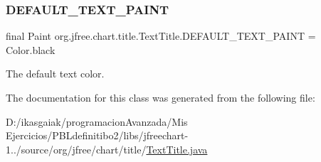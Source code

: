 \subsubsection{\texorpdfstring{D\+E\+F\+A\+U\+L\+T\+\_\+\+T\+E\+X\+T\+\_\+\+P\+A\+I\+NT}{DEFAULT\_TEXT\_PAINT}}
{\footnotesize\ttfamily final Paint org.\+jfree.\+chart.\+title.\+Text\+Title.\+D\+E\+F\+A\+U\+L\+T\+\_\+\+T\+E\+X\+T\+\_\+\+P\+A\+I\+NT = Color.\+black\hspace{0.3cm}{\ttfamily [static]}}

The default text color. 

The documentation for this class was generated from the following file\+:\begin{DoxyCompactItemize}
\item 
D\+:/ikasgaiak/programacion\+Avanzada/\+Mis Ejercicios/\+P\+B\+Ldefinitibo2/libs/jfreechart-\/1../source/org/jfree/chart/title/\mbox{\hyperlink{_text_title_8java}{Text\+Title.\+java}}\end{DoxyCompactItemize}

